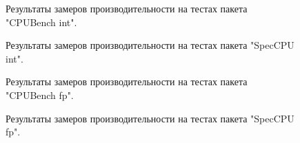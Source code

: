 \begin{figure}[ht]
	\caption{Результаты замеров производительности на тестах  пакета "CPUBench int"\phantom{}.}\label{fig:spubench_int_speedup}
\end{figure}

\begin{figure}[ht]
	\caption{Результаты замеров производительности на тестах пакета "SpecCPU int"\phantom{}.}\label{fig:spec_int_speedup}
\end{figure}

\begin{figure}[ht]
	\caption{Результаты замеров производительности на тестах  пакета "CPUBench fp"\phantom{}.}\label{fig:pubench_fp_speedup}
\end{figure}

\begin{figure}[ht]
	\caption{Результаты замеров производительности на тестах пакета "SpecCPU fp"\phantom{}.}\label{fig:spec_fp_speedup}
\end{figure}


